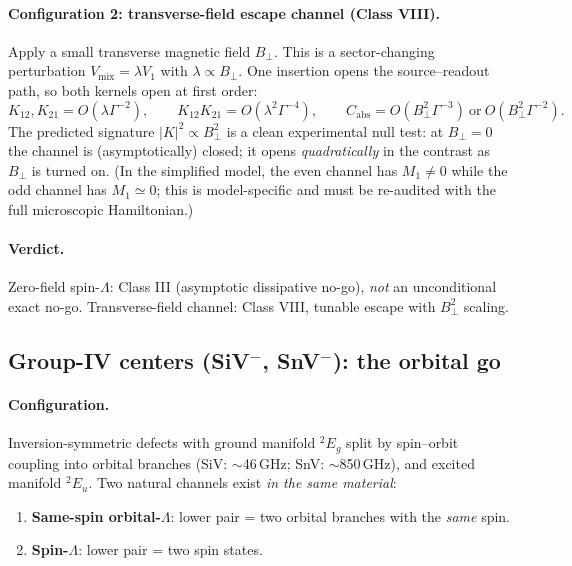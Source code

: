 \documentclass[11pt,a4paper]{article}
\theoremstyle{remark}
\begin{document}
\paragraph{Configuration 2: transverse-field escape channel (Class VIII).}
Apply a small transverse magnetic field $B_\perp$. This is a sector-changing
perturbation $V_{\mathrm{mix}}=\lambda V_1$ with $\lambda\propto B_\perp$. One
insertion opens the source--readout path, so both kernels open at first order:
\[
K_{12},K_{21}=O(\lambda\Gamma^{-2}),
\qquad
K_{12}K_{21}=O(\lambda^2\Gamma^{-4}),
\qquad
C_{\mathrm{abs}}=O(B_\perp^2\Gamma^{-3})\ \text{or}\ O(B_\perp^2\Gamma^{-2}).
\]
The predicted signature $|K|^2\propto B_\perp^2$ is a clean experimental null
test: at $B_\perp=0$ the channel is (asymptotically) closed; it opens
\emph{quadratically} in the contrast as $B_\perp$ is turned on. (In the
simplified model, the even channel has $M_1\neq0$ while the odd channel has
$M_1\simeq0$; this is model-specific and must be re-audited with the full
microscopic Hamiltonian.)

\paragraph{Verdict.} Zero-field spin-$\Lambda$: Class III (asymptotic
dissipative no-go), \emph{not} an unconditional exact no-go. Transverse-field
channel: Class VIII, tunable escape with $B_\perp^2$ scaling.

\subsection{Group-IV centers (SiV$^-$, SnV$^-$): the orbital go}

\paragraph{Configuration.}
Inversion-symmetric defects with ground manifold $^2E_g$ split by spin--orbit
coupling into orbital branches (SiV: $\sim$46\,GHz; SnV: $\sim$850\,GHz), and
excited manifold $^2E_u$. Two natural channels exist \emph{in the same
material}:
\begin{enumerate}
\item \textbf{Same-spin orbital-$\Lambda$}: lower pair = two orbital branches
      with the \emph{same} spin.
\item \textbf{Spin-$\Lambda$}: lower pair = two spin states.
\end{enumerate}
\end{document}
